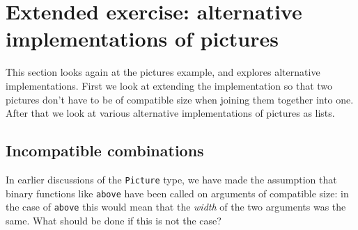 \section{Extended exercise: alternative implementations of pictures}
\label{aliterPictures}


This section looks again at the pictures example, and explores alternative implementations. First we look at extending the implementation so that two pictures don't have to be of compatible size when joining them together into one. After that we look at various alternative implementations of pictures as lists.

\subsection*{Incompatible combinations}

In earlier discussions of the \texttt{Picture} type, we have made the assumption that binary functions like \texttt{above} have been called on arguments of compatible size: in the case of \texttt{above} this would mean that the \emph{width} of the two arguments was the same. What should be done if this is not the case? 

